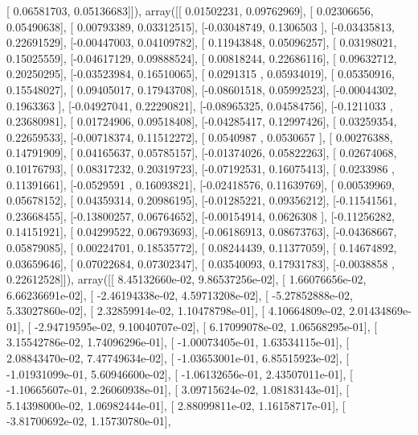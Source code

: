 \documentclass{article}
\begin{document}
       [ 0.06581703,  0.05136683]]), array([[ 0.01502231,  0.09762969],
       [ 0.02306656,  0.05490638],
       [ 0.00793389,  0.03312515],
       [-0.03048749,  0.1306503 ],
       [-0.03435813,  0.22691529],
       [-0.00447003,  0.04109782],
       [ 0.11943848,  0.05096257],
       [ 0.03198021,  0.15025559],
       [-0.04617129,  0.09888524],
       [ 0.00818244,  0.22686116],
       [ 0.09632712,  0.20250295],
       [-0.03523984,  0.16510065],
       [ 0.0291315 ,  0.05934019],
       [ 0.05350916,  0.15548027],
       [ 0.09405017,  0.17943708],
       [-0.08601518,  0.05992523],
       [-0.00044302,  0.1963363 ],
       [-0.04927041,  0.22290821],
       [-0.08965325,  0.04584756],
       [-0.1211033 ,  0.23680981],
       [ 0.01724906,  0.09518408],
       [-0.04285417,  0.12997426],
       [ 0.03259354,  0.22659533],
       [-0.00718374,  0.11512272],
       [ 0.0540987 ,  0.0530657 ],
       [ 0.00276388,  0.14791909],
       [ 0.04165637,  0.05785157],
       [-0.01374026,  0.05822263],
       [ 0.02674068,  0.10176793],
       [ 0.08317232,  0.20319723],
       [-0.07192531,  0.16075413],
       [ 0.0233986 ,  0.11391661],
       [-0.0529591 ,  0.16093821],
       [-0.02418576,  0.11639769],
       [ 0.00539969,  0.05678152],
       [ 0.04359314,  0.20986195],
       [-0.01285221,  0.09356212],
       [-0.11541561,  0.23668455],
       [-0.13800257,  0.06764652],
       [-0.00154914,  0.0626308 ],
       [-0.11256282,  0.14151921],
       [ 0.04299522,  0.06793693],
       [-0.06186913,  0.08673763],
       [-0.04368667,  0.05879085],
       [ 0.00224701,  0.18535772],
       [ 0.08244439,  0.11377059],
       [ 0.14674892,  0.03659646],
       [ 0.07022684,  0.07302347],
       [ 0.03540093,  0.17931783],
       [-0.0038858 ,  0.22612528]]), array([[  8.45132660e-02,   9.86537256e-02],
       [  1.66076656e-02,   6.66236691e-02],
       [ -2.46194338e-02,   4.59713208e-02],
       [ -5.27852888e-02,   5.33027860e-02],
       [  2.32859914e-02,   1.10478798e-01],
       [  4.10664809e-02,   2.01434869e-01],
       [ -2.94719595e-02,   9.10040707e-02],
       [  6.17099078e-02,   1.06568295e-01],
       [  3.15542786e-02,   1.74096296e-01],
       [ -1.00073405e-01,   1.63534115e-01],
       [  2.08843470e-02,   7.47749634e-02],
       [ -1.03653001e-01,   6.85515923e-02],
       [ -1.01931099e-01,   5.60946600e-02],
       [ -1.06132656e-01,   2.43507011e-01],
       [ -1.10665607e-01,   2.26060938e-01],
       [  3.09715624e-02,   1.08183143e-01],
       [  5.14398000e-02,   1.06982444e-01],
       [  2.88099811e-02,   1.16158717e-01],
       [ -3.81700692e-02,   1.15730780e-01],
\end{document}
